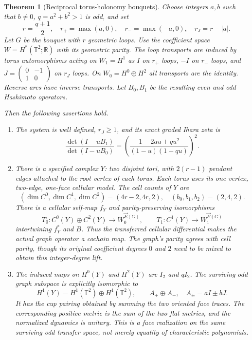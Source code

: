 \documentclass[11pt,a4paper]{article}
\newtheorem{theorem}[definition]{Theorem}
\theoremstyle{remark}\newtheorem{remark}[definition]{Remark}
\newcommand{\R}{\mathbb R}\newcommand{\C}{\mathbb C}\newcommand{\Z}{\mathbb Z}
\begin{document}
\begin{theorem}[Reciprocal torus-holonomy bouquets]\label{thm:bouquet}
Choose integers $a,b$ such that $b\ne0$, $q=a^2+b^2>1$ is odd, and set
\[
r=\frac{q+1}{2},\quad r_+=\max(a,0),\quad r_-=\max(-a,0),
\quad r_J=r-|a|.
\]
Let $G$ be the bouquet with $r$ geometric loops. Use the coefficient space
$W=H^*(\mathbb T^2;\R)$ with its geometric parity. The loop transports are induced by torus automorphisms acting on $W_1=H^1$ as $I$ on $r_+$ loops, $-I$ on $r_-$ loops, and
$J=\left(\begin{smallmatrix}0&-1\\1&0\end{smallmatrix}\right)$ on $r_J$ loops. On $W_0=H^0\oplus H^2$ all transports are the identity. Reverse arcs have inverse transports. Let $B_0,B_1$ be the resulting even and odd Hashimoto operators.

Then the following assertions hold.
\begin{enumerate}[label=(\alph*)]
\item The system is well defined, $r_J\ge1$, and its exact graded Ihara zeta is
\[
\boxed{\frac{\det(I-uB_1)}{\det(I-uB_0)}
=\left(\frac{1-2au+qu^2}{(1-u)(1-qu)}\right)^2.}\tag{8.1}\label{eq:bouquet-zeta}
\]
\item There is a specified complex $Y$: two disjoint tori, with $2(r-1)$ pendant edges attached to the root vertex of each torus. Each torus uses its one-vertex, two-edge, one-face cellular model. The cell counts of $Y$ are
\[
(\dim C^0,\dim C^1,\dim C^2)=(4r-2,4r,2),
\quad (b_0,b_1,b_2)=(2,4,2).
\]
There is a cellular self-map $f_Y$ and parity-preserving isomorphisms
\[
T_0:C^0(Y)\oplus C^2(Y)\longrightarrow W_0^{\vec E(G)},
\qquad T_1:C^1(Y)\longrightarrow W_1^{\vec E(G)}
\]
intertwining $f_Y^*$ and $B$. Thus the transferred cellular differential makes the actual graph operator a cochain map. The graph's parity agrees with cell parity, though its original coefficient degrees $0$ and $2$ need to be mixed to obtain this integer-degree lift.
\item The induced maps on $H^0(Y)$ and $H^2(Y)$ are $I_2$ and $qI_2$. The surviving odd graph subspace is explicitly isomorphic to
\[
H^1(Y)=H^1(\mathbb T^2)\oplus H^1(\mathbb T^2),\qquad
A_+\oplus A_-,\quad A_\pm=aI\pm bJ.
\]
It has the cup pairing obtained by summing the two oriented face traces. The corresponding positive metric is the sum of the two flat metrics, and the normalized dynamics is unitary. This is a face realization on the same surviving odd transfer space, not merely equality of characteristic polynomials.
\end{enumerate}
\end{theorem}
\end{document}
